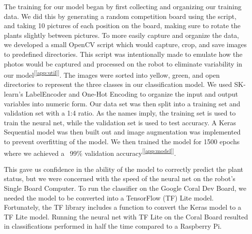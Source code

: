 \documentclass[11pt, hidelinks]{report}
\newcommand{\refapp}[1]{\textsuperscript{[\ref{#1}]}}
\begin{document}
The training for our model began by first collecting and organizing our training data. We did this by generating a random competition board using the  script, and taking 10 pictures of each position on the board, making sure to rotate the plants slightly between pictures. To more easily capture and organize the data, we developed a small OpenCV script which would capture, crop, and save images to predefined directories. This script was intentionally made to emulate how the photos would be captured and processed on the robot to eliminate variability in our model\refapp{app:util}. The images were sorted into yellow, green, and open directories to represent the three classes in our classification model. We used SK-learn’s LabelEncoder and One-Hot Encoding to organize the input and output variables into numeric form. Our data set was then split into a training set and validation set with a 1:4 ratio. As the names imply, the training set is used to train the neural net, while the validation set is used to test accuracy. A Keras Sequential model was then built out and image augmentation was implemented to prevent overfitting of the model. We then trained the model for 1500 epochs where we achieved a ~99\% validation accuracy\refapp{app:model}.

This gave us confidence in the ability of the model to correctly predict the plant status, but we were concerned with the speed of the neural net on the robot’s Single Board Computer. To run the classifier on the Google Coral Dev Board, we needed the model to be converted into a TensorFlow (TF) Lite model. Fortunately, the TF library includes a function to convert the Keras model to a TF Lite model. Running the neural net with TF Lite on the Coral Board resulted in classifications performed in half the time compared to a Raspberry Pi.
\end{document}
